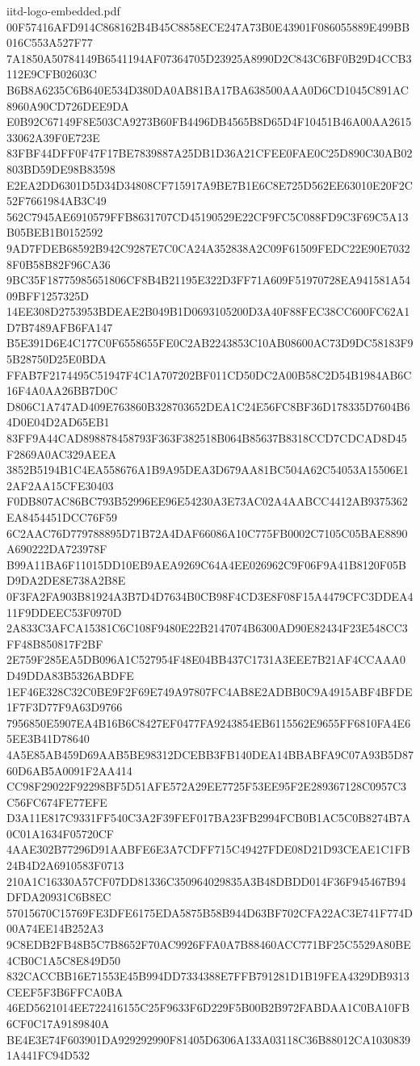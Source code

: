 \begin{filecontents*}[overwrite]{iitd-logo-embedded.pdf}
00F57416AFD914C868162B4B45C8858ECE247A73B0E43901F086055889E499BB016C553A527F77
7A1850A50784149B6541194AF07364705D23925A8990D2C843C6BF0B29D4CCB3112E9CFB02603C
B6B8A6235C6B640E534D380DA0AB81BA17BA638500AAA0D6CD1045C891AC8960A90CD726DEE9DA
E0B92C67149F8E503CA9273B60FB4496DB4565B8D65D4F10451B46A00AA261533062A39F0E723E
83FBF44DFF0F47F17BE7839887A25DB1D36A21CFEE0FAE0C25D890C30AB02803BD59DE98B83598
E2EA2DD6301D5D34D34808CF715917A9BE7B1E6C8E725D562EE63010E20F2C52F7661984AB3C49
562C7945AE6910579FFB8631707CD45190529E22CF9FC5C088FD9C3F69C5A13B05BEB1B0152592
9AD7FDEB68592B942C9287E7C0CA24A352838A2C09F61509FEDC22E90E70328F0B58B82F96CA36
9BC35F18775985651806CF8B4B21195E322D3FF71A609F51970728EA941581A5409BFF1257325D
14EE308D2753953BDEAE2B049B1D0693105200D3A40F88FEC38CC600FC62A1D7B7489AFB6FA147
B5E391D6E4C177C0F6558655FE0C2AB2243853C10AB08600AC73D9DC58183F95B28750D25E0BDA
FFAB7F2174495C51947F4C1A707202BF011CD50DC2A00B58C2D54B1984AB6C16F4A0AA26BB7D0C
D806C1A747AD409E763860B328703652DEA1C24E56FC8BF36D178335D7604B64D0E04D2AD65EB1
83FF9A44CAD898878458793F363F382518B064B85637B8318CCD7CDCAD8D45F2869A0AC329AEEA
3852B5194B1C4EA558676A1B9A95DEA3D679AA81BC504A62C54053A15506E12AF2AA15CFE30403
F0DB807AC86BC793B52996EE96E54230A3E73AC02A4AABCC4412AB9375362EA8454451DCC76F59
6C2AAC76D779788895D71B72A4DAF66086A10C775FB0002C7105C05BAE8890A690222DA723978F
B99A11BA6F11015DD10EB9AEA9269C64A4EE026962C9F06F9A41B8120F05BD9DA2DE8E738A2B8E
0F3FA2FA903B81924A3B7D4D7634B0CB98F4CD3E8F08F15A4479CFC3DDEA411F9DDEEC53F0970D
2A833C3AFCA15381C6C108F9480E22B2147074B6300AD90E82434F23E548CC3FF48B850817F2BF
2E759F285EA5DB096A1C527954F48E04BB437C1731A3EEE7B21AF4CCAAA0D49DDA83B5326ABDFE
1EF46E328C32C0BE9F2F69E749A97807FC4AB8E2ADBB0C9A4915ABF4BFDE1F7F3D77F9A63D9766
7956850E5907EA4B16B6C8427EF0477FA9243854EB6115562E9655FF6810FA4E65EE3B41D78640
4A5E85AB459D69AAB5BE98312DCEBB3FB140DEA14BBABFA9C07A93B5D8760D6AB5A0091F2AA414
CC98F29022F92298BF5D51AFE572A29EE7725F53EE95F2E289367128C0957C3C56FC674FE77EFE
D3A11E817C9331FF540C3A2F39FEF017BA23FB2994FCB0B1AC5C0B8274B7A0C01A1634F05720CF
4AAE302B77296D91AABFE6E3A7CDFF715C49427FDE08D21D93CEAE1C1FB24B4D2A6910583F0713
210A1C16330A57CF07DD81336C350964029835A3B48DBDD014F36F945467B94DFDA20931C6B8EC
57015670C15769FE3DFE6175EDA5875B58B944D63BF702CFA22AC3E741F774D00A74EE14B252A3
9C8EDB2FB48B5C7B8652F70AC9926FFA0A7B88460ACC771BF25C5529A80BE4CB0C1A5C8E849D50
832CACCBB16E71553E45B994DD7334388E7FFB791281D1B19FEA4329DB9313CEEF5F3B6FFCA0BA
46ED5621014EE722416155C25F9633F6D229F5B00B2B972FABDAA1C0BA10FB6CF0C17A9189840A
BE4E3E74F603901DA929292990F81405D6306A133A03118C36B88012CA10308391A441FC94D532

\end{filecontents*}
